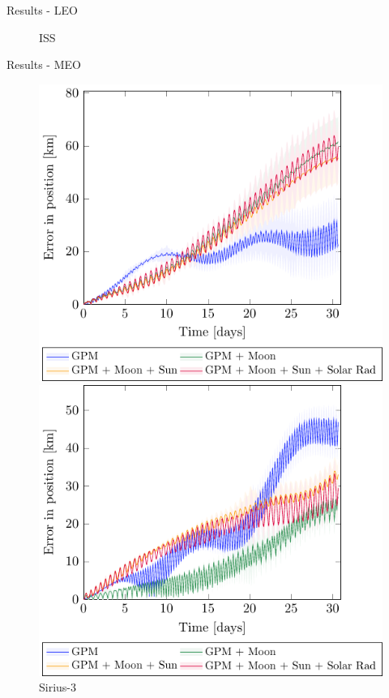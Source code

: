 \documentclass{beamer} %
\begin{document}
\begin{frame}{Results - LEO}
\begin{figure}[htbp]
\begin{minipage}[ht]{0.45\textwidth}
      \caption{\hspace{0.8cm}ISS}
    \end{minipage}
  \end{figure}
\end{frame}
\begin{frame}{Results - MEO}
  \begin{figure}[ht]
    \centering
    \begin{minipage}[ht]{0.45\textwidth}
      \centering
      \includegraphics[width=\textwidth]{../Images/simulation/SIRIUS.pdf}
      \caption{Sirius-3}
    \end{minipage}
    \hspace{0.0333333\textwidth}
    \begin{minipage}[ht]{0.45\textwidth}
      \centering
      \includegraphics[width=\textwidth]{../Images/simulation/GALILEO.pdf}

\end{minipage}
\end{figure}
\end{frame}
\end{document}
